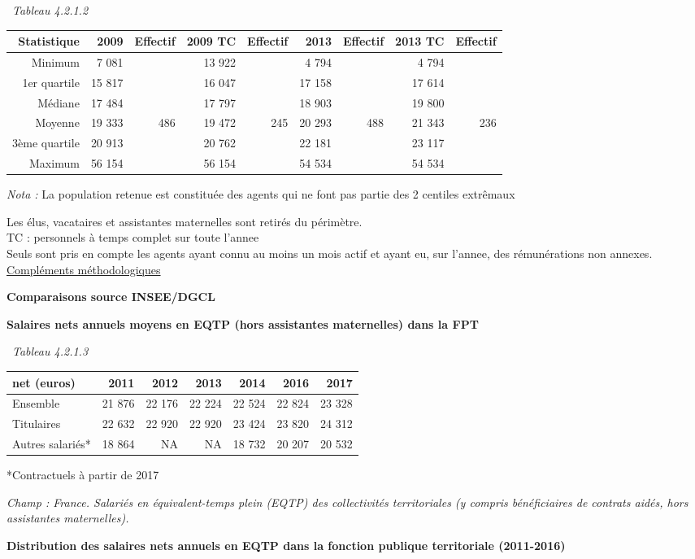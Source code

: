 ~\emph{Tableau 4.2.1.2}

\begin{longtable}[]{@{}rrrrrrrrr@{}}
\toprule
Statistique & 2009 & Effectif & 2009 TC & Effectif & 2013 & Effectif &
2013 TC & Effectif\tabularnewline
\midrule
\endhead
Minimum & 7 081 & & 13 922 & & 4 794 & & 4 794 &\tabularnewline
1er quartile & 15 817 & & 16 047 & & 17 158 & & 17 614 &\tabularnewline
Médiane & 17 484 & & 17 797 & & 18 903 & & 19 800 &\tabularnewline
Moyenne & 19 333 & 486 & 19 472 & 245 & 20 293 & 488 & 21 343 &
236\tabularnewline
3ème quartile & 20 913 & & 20 762 & & 22 181 & & 23 117 &\tabularnewline
Maximum & 56 154 & & 56 154 & & 54 534 & & 54 534 &\tabularnewline
\bottomrule
\end{longtable}

\emph{Nota :} La population retenue est constituée des agents qui ne
font pas partie des 2 centiles extrêmaux

Les élus, vacataires et assistantes maternelles sont retirés du
périmètre.\\
TC : personnels à temps complet sur toute l'annee\\
Seuls sont pris en compte les agents ayant connu au moins un mois actif
et ayant eu, sur l'annee, des rémunérations non annexes.\\
\href{../Docs/méthodologie.pdf}{Compléments méthodologiques}

\textbf{Comparaisons source INSEE/DGCL}

\textbf{Salaires nets annuels moyens en EQTP (hors assistantes
maternelles) dans la FPT}

~\emph{Tableau 4.2.1.3}

\begin{longtable}[]{@{}lrrrrrr@{}}
\toprule
net (euros) & 2011 & 2012 & 2013 & 2014 & 2016 & 2017\tabularnewline
\midrule
\endhead
Ensemble & 21 876 & 22 176 & 22 224 & 22 524 & 22 824 & 23
328\tabularnewline
Titulaires & 22 632 & 22 920 & 22 920 & 23 424 & 23 820 & 24
312\tabularnewline
Autres salariés* & 18 864 & NA & NA & 18 732 & 20 207 & 20
532\tabularnewline
\bottomrule
\end{longtable}

*Contractuels à partir de 2017

\emph{Champ : France. Salariés en équivalent-temps plein (EQTP) des
collectivités territoriales (y compris bénéficiaires de contrats aidés,
hors assistantes maternelles).}

\textbf{Distribution des salaires nets annuels en EQTP dans la fonction
publique territoriale (2011-2016)}

